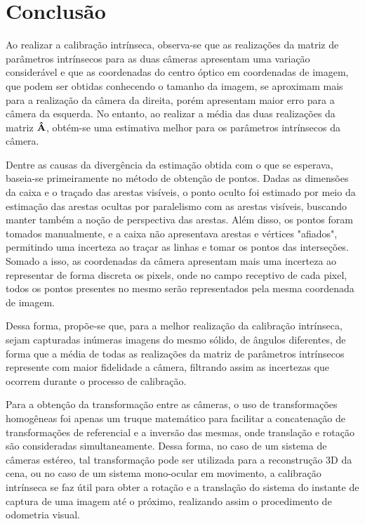 \clearpage
\section{Conclusão}

Ao realizar a calibração intrínseca, observa-se que as realizações da matriz de parâmetros intrínsecos para as duas câmeras apresentam uma variação considerável e que as coordenadas do centro óptico em coordenadas de imagem, que podem ser obtidas conhecendo o tamanho da imagem, se aproximam mais para a realização da câmera da direita, porém apresentam maior erro para a câmera da esquerda. No entanto, ao realizar a média das duas realizações da matriz $\mathbf{\hat{A}}$, obtém-se uma estimativa melhor para os parâmetros intrínsecos da câmera.

Dentre as causas da divergência da estimação obtida com o que se esperava, baseia-se primeiramente no método de obtenção de pontos. Dadas as dimensões da caixa e o traçado das arestas visíveis, o ponto oculto foi estimado por meio da estimação das arestas ocultas por paralelismo com as arestas visíveis, buscando manter também a noção de perspectiva das arestas. Além disso, os pontos foram tomados manualmente, e a caixa não apresentava arestas e vértices "afiados", permitindo uma incerteza ao traçar as linhas e tomar os pontos das interseções. Somado a isso, as coordenadas da câmera apresentam mais uma incerteza ao representar de forma discreta os pixels, onde no campo receptivo de cada pixel, todos os pontos presentes no mesmo serão representados pela mesma coordenada de imagem.

Dessa forma, propõe-se que, para a melhor realização da calibração intrínseca, sejam capturadas inúmeras imagens do mesmo sólido, de ângulos diferentes, de forma que a média de todas as realizações da matriz de parâmetros intrínsecos represente com maior fidelidade a câmera, filtrando assim as incertezas que ocorrem durante o processo de calibração.

Para a obtenção da transformação entre as câmeras, o uso de transformações homogêneas foi apenas um truque matemático para facilitar a concatenação de transformações de referencial e a inversão das mesmas, onde translação e rotação são consideradas simultaneamente. Dessa forma, no caso de um sistema de câmeras estéreo, tal transformação pode ser utilizada para a reconstrução 3D da cena, ou no caso de um sistema mono-ocular em movimento, a calibração intrínseca se faz útil para obter a rotação e a translação do sistema do instante de captura de uma imagem até o próximo, realizando assim o procedimento de odometria visual.